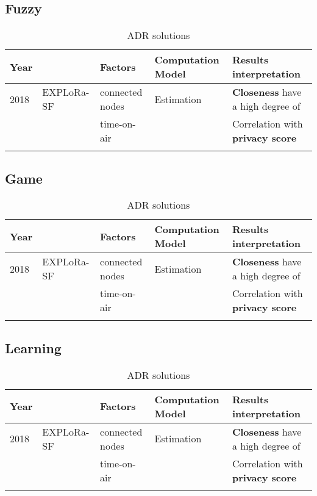 \subsection{Fuzzy}
\begin{longtable}{lllll}
	Year  & \                                              & \textbf{Factors}           & \textbf{Computation Model}             & \textbf{Results interpretation}                               \\\hline
	2018  & EXPLoRa-SF \cite{cuomo_explora_2017}           & connected nodes            & Estimation                             & \textbf{Closeness} have a high degree of                      \\
	\     &                                                & time-on-air                &                                        & Correlation with \textbf{privacy score}                       \\\hline

\caption{ADR solutions}
\end{longtable}


\subsection{Game}
\begin{longtable}{lllll}
	Year  & \                                              & \textbf{Factors}           & \textbf{Computation Model}             & \textbf{Results interpretation}                               \\\hline
	2018  & EXPLoRa-SF \cite{cuomo_explora_2017}           & connected nodes            & Estimation                             & \textbf{Closeness} have a high degree of                      \\
	\     &                                                & time-on-air                &                                        & Correlation with \textbf{privacy score}                       \\\hline

\caption{ADR solutions}
\end{longtable}


\subsection{Learning}
\begin{longtable}{lllll}
	Year  & \                                              & \textbf{Factors}           & \textbf{Computation Model}             & \textbf{Results interpretation}                               \\\hline
	2018  & EXPLoRa-SF \cite{cuomo_explora_2017}           & connected nodes            & Estimation                             & \textbf{Closeness} have a high degree of                      \\
	\     &                                                & time-on-air                &                                        & Correlation with \textbf{privacy score}                       \\\hline

\caption{ADR solutions}
\end{longtable}


